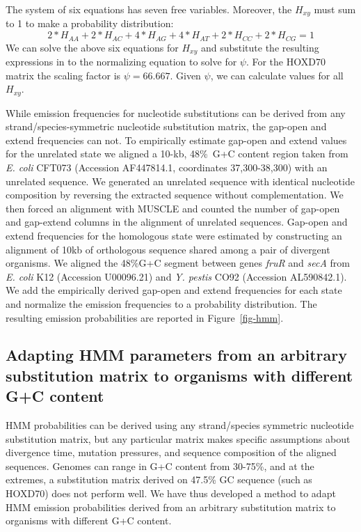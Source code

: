 \documentclass[9.5pt,journal,final,finalsubmission,twocolumn]{IEEEtran}
\begin{document}
The system of six equations has seven free variables.  Moreover, the $H_{xy}$ must sum to 1 to make a probability distribution:
\begin{equation}
2*H_{AA} + 2*H_{AC} + 4*H_{AG} + 4*H_{AT} + 2*H_{CC} + 2*H_{CG} = 1
\end{equation}
We can solve the above six equations for $H_{xy}$ and substitute the
resulting expressions in to the normalizing equation to solve for
$\psi$. For the HOXD70 matrix the scaling factor is $\psi=66.667$. Given
$\psi$, we can calculate values for all $H_{xy}$.


While emission frequencies for nucleotide substitutions can be derived from
any strand/species-symmetric nucleotide substitution matrix, the gap-open
and extend frequencies can not.  To empirically estimate gap-open and extend values
for the unrelated state we aligned a 10-kb, 48\%~G+C content region
taken from \emph{E. coli} CFT073 (Accession AF447814.1, coordinates
37,300-38,300) with an unrelated sequence.  We generated an unrelated
sequence with identical nucleotide composition by reversing the
extracted sequence without complementation.  We then forced an
alignment with MUSCLE and counted the number of gap-open and gap-extend
columns in the alignment of unrelated sequences.  Gap-open and
extend frequencies for the homologous state were estimated by
constructing an alignment of 10kb of orthologous sequence shared among
a pair of divergent organisms.  We aligned the 48\%G+C segment between
genes \textit{fruR} and \textit{secA} from \textit{E. coli} K12
(Accession U00096.21) and \emph{Y. pestis} CO92 (Accession
AL590842.1). We add the empirically derived gap-open and extend
frequencies for each state and normalize the emission frequencies to a
probability distribution.  The resulting emission probabilities are
reported in Figure~\ref{fig-hmm}.

\subsection{Adapting HMM parameters from an arbitrary substitution matrix to organisms with different G+C content}
HMM probabilities can be derived using any strand/species symmetric nucleotide substitution matrix,
but any particular matrix makes specific assumptions about divergence time, mutation pressures,
and sequence composition of the aligned sequences.
Genomes can range in G+C content from 30-75\%, and at the extremes,
a substitution matrix derived on 47.5\% GC sequence (such as HOXD70) does not
perform well.  We have thus developed a method to adapt HMM emission
probabilities derived from an arbitrary substitution matrix
to organisms with different G+C content.
\end{document}
